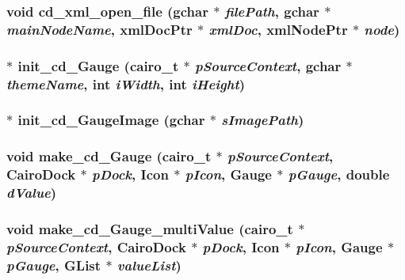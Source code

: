 \subsubsection{\setlength{\rightskip}{0pt plus 5cm}void cd\_\-xml\_\-open\_\-file (gchar $\ast$ {\em filePath}, gchar $\ast$ {\em mainNodeName}, xmlDocPtr $\ast$ {\em xmlDoc}, xmlNodePtr $\ast$ {\em node})}\label{cairo-dock-gauge_8h_f1d50bee7439f7ace641e976f2cc747f}


\subsubsection{$\ast$ init\_\-cd\_\-Gauge (cairo\_\-t $\ast$ {\em pSourceContext}, gchar $\ast$ {\em themeName}, int {\em iWidth}, int {\em iHeight})}\label{cairo-dock-gauge_8h_7195e5051e1688effb561dee2e6b0171}


\subsubsection{$\ast$ init\_\-cd\_\-GaugeImage (gchar $\ast$ {\em sImagePath})}\label{cairo-dock-gauge_8h_b3fc186eed5a1e27bdbac4e00ace0cea}


\subsubsection{\setlength{\rightskip}{0pt plus 5cm}void make\_\-cd\_\-Gauge (cairo\_\-t $\ast$ {\em pSourceContext}, {\bf CairoDock} $\ast$ {\em pDock}, {\bf Icon} $\ast$ {\em pIcon}, {\bf Gauge} $\ast$ {\em pGauge}, double {\em dValue})}\label{cairo-dock-gauge_8h_c482c6078596008460b89d5974c61ee5}


\subsubsection{\setlength{\rightskip}{0pt plus 5cm}void make\_\-cd\_\-Gauge\_\-multiValue (cairo\_\-t $\ast$ {\em pSourceContext}, {\bf CairoDock} $\ast$ {\em pDock}, {\bf Icon} $\ast$ {\em pIcon}, {\bf Gauge} $\ast$ {\em pGauge}, GList $\ast$ {\em valueList})}\label{cairo-dock-gauge_8h_74976e18a5b17103f4eb55918f2a0629}


